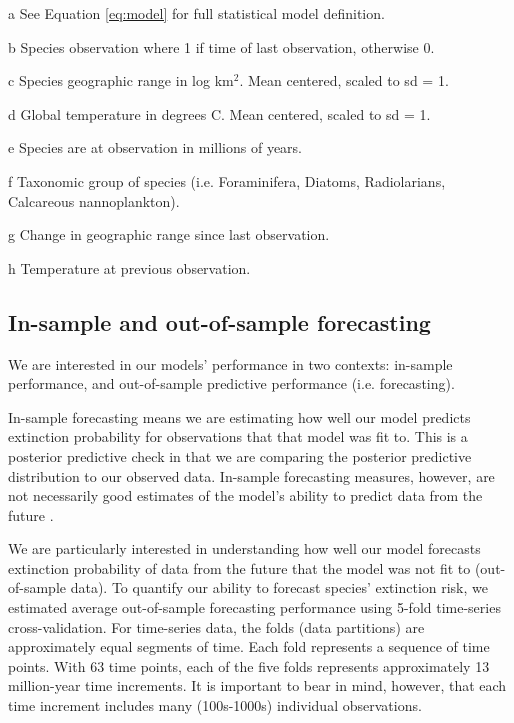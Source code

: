 \documentclass[12pt,letterpaper]{article}
\begin{document}
\begin{refsection}
\begin{table}[ht]
\begin{threeparttable}
{\begin{tabular}{ l p{3cm} l l }
    \hline
   \end{tabular}
  }
  \begin{tablenotes}
  \item[a] See Equation \ref{eq:model} for full statistical model definition.
  \item[b] Species observation where 1 if time of last observation, otherwise 0.
  \item[c] Species geographic range in log km\(^2\). Mean centered, scaled to sd = 1.
  \item[d] Global temperature in degrees C. Mean centered, scaled to sd = 1.
  \item[e] Species are at observation in millions of years.
  \item[f] Taxonomic group of species (i.e. Foraminifera, Diatoms, Radiolarians, Calcareous nannoplankton).
  \item[g] Change in geographic range since last observation.
  \item[h] Temperature at previous observation.
  \end{tablenotes}
 \end{threeparttable}
 \label{tab:model_def}
\end{table}


\subsection{In-sample and out-of-sample forecasting}

We are interested in our models' performance in two contexts: in-sample performance, and out-of-sample predictive performance (i.e. forecasting). 

In-sample forecasting means we are estimating how well our model predicts extinction probability for observations that that model was fit to. This is a posterior predictive check in that we are comparing the posterior predictive distribution to our observed data. In-sample forecasting measures, however, are not necessarily good estimates of the model's ability to predict data from the future \citep{ESL}. 

We are particularly interested in understanding how well our model forecasts extinction probability of data from the future that the model was not fit to (out-of-sample data). To quantify our ability to forecast species' extinction risk, we estimated average out-of-sample forecasting performance using 5-fold time-series cross-validation. For time-series data, the folds (data partitions) are approximately equal segments of time. Each fold represents a sequence of time points. With 63 time points, each of the five folds represents approximately 13 million-year time increments. It is important to bear in mind, however, that each time increment includes many (100s-1000s) individual observations.


\end{refsection}
\end{document}
